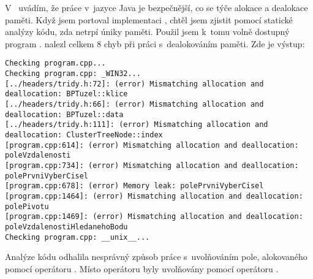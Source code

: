 V~ uvádím, že práce v~jazyce Java je bezpečnější, co se týče alokace a dealokace paměti.
Když jsem portoval implementaci \CC{}, chtěl jsem zjistit pomocí statické analýzy kódu, zda netrpí úniky paměti.
Použil jsem k~tomu volně dostupný program \cite{cppcheck}.
 nalezl celkem \num{8} chyb při práci s~dealokováním paměti. Zde je výstup:
{\tiny
\begin{verbatim}
Checking program.cpp...
Checking program.cpp: _WIN32...
[../headers/tridy.h:72]: (error) Mismatching allocation and deallocation: BPTuzel::klice
[../headers/tridy.h:66]: (error) Mismatching allocation and deallocation: BPTuzel::data
[../headers/tridy.h:111]: (error) Mismatching allocation and deallocation: ClusterTreeNode::index
[program.cpp:614]: (error) Mismatching allocation and deallocation: poleVzdalenosti
[program.cpp:734]: (error) Mismatching allocation and deallocation: polePrvniVyberCisel
[program.cpp:678]: (error) Memory leak: polePrvniVyberCisel
[program.cpp:1464]: (error) Mismatching allocation and deallocation: polePivotu
[program.cpp:1469]: (error) Mismatching allocation and deallocation: poleVzdalenostiHledanehoBodu
Checking program.cpp: __unix__...
\end{verbatim}
}

Analýze kódu odhalila nesprávný způsob práce s~uvolňováním pole, alokovaného pomocí operátoru . Místo operátoru  byly uvolňovány pomocí operátoru \cite{Stroustrup:1997:CPL:523265}.